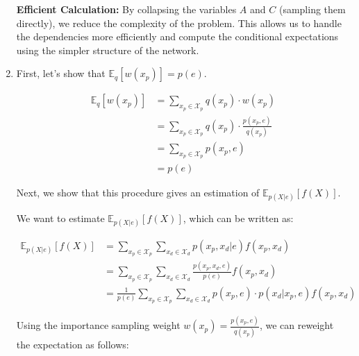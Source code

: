 \documentclass[a4 paper]{article}
\begin{document}
\begin{enumerate}
\textbf{Efficient Calculation:}
By collapsing the variables \( A \) and \( C \) (sampling them directly), we reduce the complexity of the problem. This allows us to handle the dependencies more efficiently and compute the conditional expectations using the simpler structure of the network.

  




    \item {}


 
First, let's show that \( \mathbb{E}_q[w(x_p)] = p(e) \).

\begin{align*}
\mathbb{E}_q[w(x_p)] &= \sum_{x_p \in \mathcal{X}_p} q(x_p) \cdot w(x_p) \\
&= \sum_{x_p \in \mathcal{X}_p} q(x_p) \cdot \frac{p(x_p, e)}{q(x_p)} \\
&= \sum_{x_p \in \mathcal{X}_p} p(x_p, e) \\
&= p(e)
\end{align*}

Next, we show that this procedure gives an estimation of \( \mathbb{E}_{p(X|e)}[f(X)] \).

We want to estimate \( \mathbb{E}_{p(X|e)}[f(X)] \), which can be written as:

\begin{align*}
\mathbb{E}_{p(X|e)}[f(X)] &= \sum_{x_p \in \mathcal{X}_p} \sum_{x_d \in \mathcal{X}_d} p(x_p, x_d | e) f(x_p, x_d) \\
&= \sum_{x_p \in \mathcal{X}_p} \sum_{x_d \in \mathcal{X}_d} \frac{p(x_p, x_d, e)}{p(e)} f(x_p, x_d) \\
&= \frac{1}{p(e)} \sum_{x_p \in \mathcal{X}_p} \sum_{x_d \in \mathcal{X}_d} p(x_p, e) \cdot p(x_d | x_p, e) f(x_p, x_d)
\end{align*}

Using the importance sampling weight \( w(x_p) = \frac{p(x_p, e)}{q(x_p)} \), we can reweight the expectation as follows:


\end{enumerate}
\end{document}
